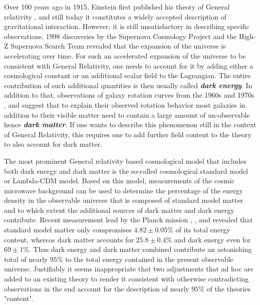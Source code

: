 \documentclass[a4paper,12pt, DIV=14, BCOR=5mm, twoside, headsepline, numbers=noenddot]{scrbook}
\begin{document}
Over 100 years ago in 1915, Einstein first published his theory of General relativity \cite{1915SPAW.......844E}, and still today it constitutes a widely accepted description of gravitational interaction. However, it is still unsatisfactory in describing specific observations. 1998 discoveries by the Supernova Cosmology Project \cite{1999ApJ...517..565P} and the High-Z Supernova Search Team \cite{1998AJ....116.1009R} revealed that the expansion of the universe is accelerating over time. For such an accelerated expansion of the universe to be consistent with General Relativity, one needs to account for it by adding either a cosmological constant or an additional scalar field to the Lagrangian. The entire contribution of such additional quantities is then usually called \textit{\textbf{dark energy}}.
In addition to that, observations of galaxy rotation curves from the 1960s and 1970s \cite{1970ApJ...160..811F}, \cite{1970ApJ...159..379R} and \cite{1980ApJ...238..471R} suggest that to explain their observed rotation behavior most galaxies in addition to their visible matter need to contain a large amount of un-observable hence \textit{\textbf{dark matter}}.
If one wants to describe this phenomenon still in the context of General Relativity, this requires one to add further field content to the theory to also account for dark matter. 

The most prominent General relativity based cosmological model that includes both dark energy and dark matter is the so-called cosmological standard model or Lambda-CDM model. Based on this model, measurements of the cosmic microwave background can be used to determine the percentage of the energy density in the observable universe that is composed of standard model matter and to which extent the additional sources of dark matter and dark energy contribute. Recent measurement lead by the Planck mission \cite{Planck13_1}, \cite{Planck13_2}, \cite{Planck15} and \cite{Planck18} revealed that standard model matter only compromises $4.82\pm0.05\%$ of its total energy content, whereas dark matter accounts for $ 25.8\pm0.4\%$ and dark energy even for $ 69 \pm 1 \%$. Thus dark energy and dark matter combined contribute an astonishing total of nearly $95 \%$ to the total energy contained in the present observable universe.
Justifiably it seems inappropriate that two adjustments that ad hoc are added to an existing theory to render it consistent with otherwise contradicting observations in the end account for the description of nearly $95\%$ of the theories "content".  
\end{document}
